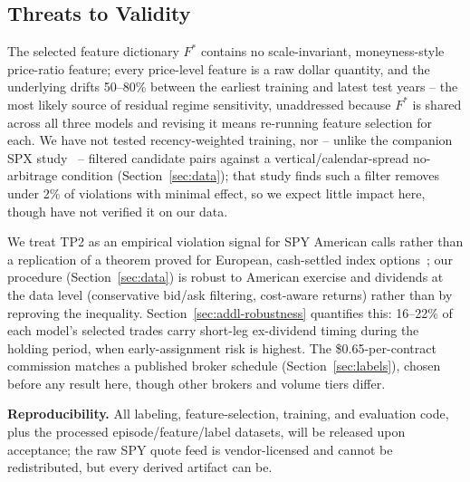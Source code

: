 \documentclass[sigconf,review]{acmart}
\begin{document}
\subsection{Threats to Validity}
\label{sec:limitations}
The selected feature dictionary $F^{\ast}$ contains no scale-invariant, moneyness-style price-ratio feature; every price-level feature is a raw dollar quantity, and the underlying drifts 50--80\% between the earliest training and latest test years -- the most likely source of residual regime sensitivity, unaddressed because $F^{\ast}$ is shared across all three models and revising it means re-running feature selection for each. We have not tested recency-weighted training, nor -- unlike the companion SPX study~\cite{glasserman2025tp2} -- filtered candidate pairs against a vertical/calendar-spread no-arbitrage condition (Section~\ref{sec:data}); that study finds such a filter removes under 2\% of violations with minimal effect, so we expect little impact here, though have not verified it on our data.

We treat TP2 as an empirical violation signal for SPY American calls rather than a replication of a theorem proved for European, cash-settled index options~\cite{glasserman2026tp2theory,cosma2020earlyexercise}; our procedure (Section~\ref{sec:data}) is robust to American exercise and dividends at the data level (conservative bid/ask filtering, cost-aware returns) rather than by reproving the inequality. Section~\ref{sec:addl-robustness} quantifies this: 16--22\% of each model's selected trades carry short-leg ex-dividend timing during the holding period, when early-assignment risk is highest. The \$0.65-per-contract commission matches a published broker schedule (Section~\ref{sec:labels}), chosen before any result here, though other brokers and volume tiers differ.

\textbf{Reproducibility.} All labeling, feature-selection, training, and evaluation code, plus the processed episode/feature/label datasets, will be released upon acceptance; the raw SPY quote feed is vendor-licensed and cannot be redistributed, but every derived artifact can be.
\end{document}
